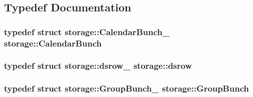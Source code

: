 \subsection{Typedef Documentation}
\hypertarget{namespacestorage_ac4b36de546d492a5eb55d70a72c08f14}{
\subsubsection[{CalendarBunch}]{\setlength{\rightskip}{0pt plus 5cm}typedef struct {\bf storage::CalendarBunch\_\-}  {\bf storage::CalendarBunch}}}
\label{d0/daa/namespacestorage_ac4b36de546d492a5eb55d70a72c08f14}
\hypertarget{namespacestorage_a5806ba33485809beb877f39b4b40e6d7}{
\subsubsection[{dsrow}]{\setlength{\rightskip}{0pt plus 5cm}typedef struct {\bf storage::dsrow\_\-}  {\bf storage::dsrow}}}
\label{d0/daa/namespacestorage_a5806ba33485809beb877f39b4b40e6d7}
\hypertarget{namespacestorage_a60a9af319d8176e62e7c86009c060b5a}{
\subsubsection[{GroupBunch}]{\setlength{\rightskip}{0pt plus 5cm}typedef struct {\bf storage::GroupBunch\_\-}  {\bf storage::GroupBunch}}}
\label{d0/daa/namespacestorage_a60a9af319d8176e62e7c86009c060b5a}


